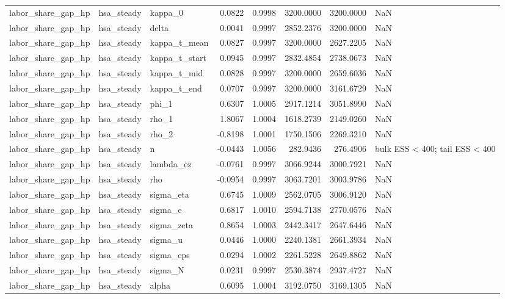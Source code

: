 \begin{tabular}{lllrrrrl}
labor\_share\_gap\_hp & hsa\_steady & kappa\_0 & 0.0822 & 0.9998 & 3200.0000 & 3200.0000 & NaN \\
labor\_share\_gap\_hp & hsa\_steady & delta & 0.0041 & 0.9997 & 2852.2376 & 3200.0000 & NaN \\
labor\_share\_gap\_hp & hsa\_steady & kappa\_t\_mean & 0.0827 & 0.9997 & 3200.0000 & 2627.2205 & NaN \\
labor\_share\_gap\_hp & hsa\_steady & kappa\_t\_start & 0.0945 & 0.9997 & 2832.4854 & 2738.0673 & NaN \\
labor\_share\_gap\_hp & hsa\_steady & kappa\_t\_mid & 0.0828 & 0.9997 & 3200.0000 & 2659.6036 & NaN \\
labor\_share\_gap\_hp & hsa\_steady & kappa\_t\_end & 0.0707 & 0.9997 & 3200.0000 & 3161.6729 & NaN \\
labor\_share\_gap\_hp & hsa\_steady & phi\_1 & 0.6307 & 1.0005 & 2917.1214 & 3051.8990 & NaN \\
labor\_share\_gap\_hp & hsa\_steady & rho\_1 & 1.8067 & 1.0004 & 1618.2739 & 2149.0260 & NaN \\
labor\_share\_gap\_hp & hsa\_steady & rho\_2 & -0.8198 & 1.0001 & 1750.1506 & 2269.3210 & NaN \\
labor\_share\_gap\_hp & hsa\_steady & n & -0.0443 & 1.0056 & 282.9436 & 276.4906 & bulk ESS < 400; tail ESS < 400 \\
labor\_share\_gap\_hp & hsa\_steady & lambda\_ez & -0.0761 & 0.9997 & 3066.9244 & 3000.7921 & NaN \\
labor\_share\_gap\_hp & hsa\_steady & rho & -0.0954 & 0.9997 & 3063.7201 & 3003.9786 & NaN \\
labor\_share\_gap\_hp & hsa\_steady & sigma\_eta & 0.6745 & 1.0009 & 2562.0705 & 3006.9120 & NaN \\
labor\_share\_gap\_hp & hsa\_steady & sigma\_e & 0.6817 & 1.0010 & 2594.7138 & 2770.0576 & NaN \\
labor\_share\_gap\_hp & hsa\_steady & sigma\_zeta & 0.8654 & 1.0003 & 2442.3417 & 2647.6446 & NaN \\
labor\_share\_gap\_hp & hsa\_steady & sigma\_u & 0.0446 & 1.0000 & 2240.1381 & 2661.3934 & NaN \\
labor\_share\_gap\_hp & hsa\_steady & sigma\_eps & 0.0294 & 1.0002 & 2261.5228 & 2649.8862 & NaN \\
labor\_share\_gap\_hp & hsa\_steady & sigma\_N & 0.0231 & 0.9997 & 2530.3874 & 2937.4727 & NaN \\
labor\_share\_gap\_hp & hsa\_steady & alpha & 0.6095 & 1.0004 & 3192.0750 & 3169.1305 & NaN \\

\end{tabular}
